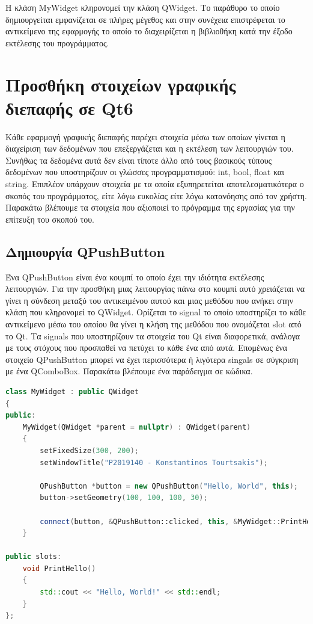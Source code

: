 Η κλάση MyWidget κληρονομεί την κλάση QWidget. Το παράθυρο το οποίο δημιουργείται
εμφανίζεται σε πλήρες μέγεθος και στην συνέχεια επιστρέφεται το αντικείμενο της εφαρμογής
το οποίο το διαχειρίζεται η βιβλιοθήκη κατά την έξοδο εκτέλεσης του προγράμματος.


\section{Προσθήκη στοιχείων γραφικής διεπαφής σε Qt6}
Κάθε εφαρμογή γραφικής διεπαφής παρέχει στοιχεία μέσω των οποίων γίνεται η διαχείριση
των δεδομένων που επεξεργάζεται και η εκτέλεση των λειτουργιών του. Συνήθως τα δεδομένα αυτά δεν είναι τίποτε άλλο από
τους βασικούς τύπους δεδομένων που υποστηρίζουν οι γλώσσες προγραμματισμού:
int, bool, float και string. Επιπλέον υπάρχουν στοιχεία με τα οποία εξυπηρετείται
αποτελεσματικότερα ο σκοπός του προγράμματος, είτε λόγω ευκολίας είτε λόγω κατανόησης
από τον χρήστη. Παρακάτω βλέπουμε τα στοιχεία που αξιοποιεί το πρόγραμμα της
εργασίας για την επίτευξη του σκοπού του.

\subsection{Δημιουργία QPushButton}
Ένα QPushButton είναι ένα κουμπί το οποίο έχει την ιδιότητα εκτέλεσης λειτουργιών.
Για την προσθήκη μιας λειτουργίας πάνω στο κουμπί αυτό χρειάζεται να γίνει η
σύνδεση μεταξύ του αντικειμένου αυτού και μιας μεθόδου που ανήκει στην κλάση που
κληρονομεί το QWidget. Ορίζεται το signal το οποίο υποστηρίζει το κάθε αντικείμενο
μέσω του οποίου θα γίνει η κλήση της μεθόδου που ονομάζεται slot από το Qt.
Τα signals που υποστηρίζουν τα στοιχεία του Qt είναι διαφορετικά, ανάλογα με τους
στόχους που προσπαθεί να πετύχει το κάθε ένα από αυτά. Επομένως ένα στοιχείο QPushButton
μπορεί να έχει περισσότερα ή λιγότερα singals σε σύγκριση με ένα QComboBox.
Παρακάτω βλέπουμε ένα παράδειγμα σε κώδικα.
\begin{lstlisting}[language=C++, style=cppstyle]
class MyWidget : public QWidget 
{
public:
    MyWidget(QWidget *parent = nullptr) : QWidget(parent) 
    {
        setFixedSize(300, 200);
        setWindowTitle("P2019140 - Konstantinos Tourtsakis");

        QPushButton *button = new QPushButton("Hello, World", this);
        button->setGeometry(100, 100, 100, 30);

        connect(button, &QPushButton::clicked, this, &MyWidget::PrintHello);
    }

public slots:
    void PrintHello() 
    {
        std::cout << "Hello, World!" << std::endl;
    }
};
\end{lstlisting}

